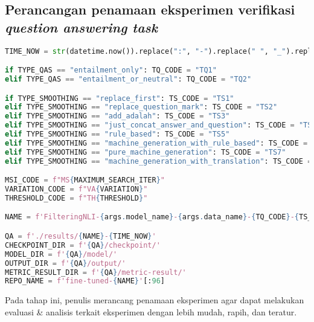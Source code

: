 \subsection{Perancangan penamaan eksperimen verifikasi \emph{question answering task}}
\begin{lstlisting}[language=Python, caption=Perancangan penamaan eksperimen \emph{question answering task}]
TIME_NOW = str(datetime.now()).replace(":", "-").replace(" ", "_").replace(".", "_")

if TYPE_QAS == "entailment_only": TQ_CODE = "TQ1"
elif TYPE_QAS == "entailment_or_neutral": TQ_CODE = "TQ2"

if TYPE_SMOOTHING == "replace_first": TS_CODE = "TS1"
elif TYPE_SMOOTHING == "replace_question_mark": TS_CODE = "TS2"
elif TYPE_SMOOTHING == "add_adalah": TS_CODE = "TS3"
elif TYPE_SMOOTHING == "just_concat_answer_and_question": TS_CODE = "TS4"
elif TYPE_SMOOTHING == "rule_based": TS_CODE = "TS5"
elif TYPE_SMOOTHING == "machine_generation_with_rule_based": TS_CODE = "TS6"
elif TYPE_SMOOTHING == "pure_machine_generation": TS_CODE = "TS7"
elif TYPE_SMOOTHING == "machine_generation_with_translation": TS_CODE = "TS8"

MSI_CODE = f"MS{MAXIMUM_SEARCH_ITER}"
VARIATION_CODE = f"VA{VARIATION}"
THRESHOLD_CODE = f"TH{THRESHOLD}"

NAME = f'FilteringNLI-{args.model_name}-{args.data_name}-{TQ_CODE}-{TS_CODE}-{MSI_CODE}-{VARIATION_CODE}-{THRESHOLD_CODE}'

QA = f'./results/{NAME}-{TIME_NOW}'
CHECKPOINT_DIR = f'{QA}/checkpoint/'
MODEL_DIR = f'{QA}/model/'
OUTPUT_DIR = f'{QA}/output/'
METRIC_RESULT_DIR = f'{QA}/metric-result/'
REPO_NAME = f'fine-tuned-{NAME}'[:96]
\end{lstlisting}

Pada tahap ini, penulis merancang penamaan eksperimen agar dapat melakukan evaluasi \& analisis terkait eksperimen dengan lebih mudah, rapih, dan teratur.

